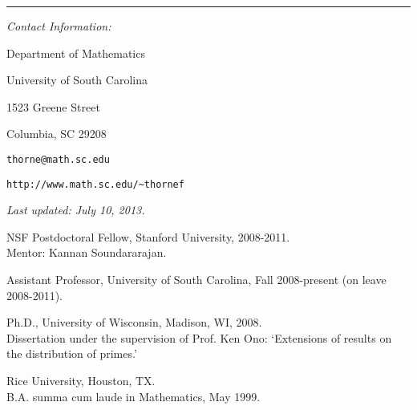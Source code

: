 \documentclass{article}
\newcommand{\name}[1]{
  \begin{center}
    \raisebox{-1.4ex}{\LARGE #1}
  \end{center}
}
\newcommand{\categorywidth}{1in}        %
\newcommand{\infowidth}{5.8in}          %
\newcommand{\categorysep}{5pt}
\newcommand{\catlistlabel}[1]%
{\raisebox{0pt}[1ex][0pt]{\makebox[\labelwidth][l]%
    {\parbox[t]{\labelwidth}{\hspace{0pt}\textbf{#1}}}}}
\newenvironment{categories}{\begin{list}{}{
      \setlength{\labelwidth}{\categorywidth}
      \setlength{\leftmargin}{\labelwidth}
      \addtolength{\leftmargin}{\labelsep}
      \setlength{\topsep}{20pt}
      \setlength{\itemsep}{\categorysep}
      \renewcommand{\makelabel}{\catlistlabel}
      }}{\end{list}}
\newcommand{\category}[1]{\item[#1]}
\newcommand{\rawentry}[1]{{\begin{minipage}[t]{\infowidth}{#1}
    \end{minipage}}}
\begin{document}
\begin{flushleft}


\name{FRANK THORNE}
\rule{7.0in}{.05cm}
\vspace{.15ex}


{\em Contact Information:} %

Department of Mathematics %

University of South Carolina %

1523 Greene Street %

Columbia, SC 29208%

\texttt{thorne@math.sc.edu}

\texttt{http://www.math.sc.edu/\~{}thornef}

\vskip 0.1in
{\em Last updated: July 10, 2013.}


\begin{categories}

  \category{Employment}

  \rawentry{NSF Postdoctoral Fellow, Stanford University, 2008-2011. \\
  Mentor: Kannan Soundararajan.}

  \rawentry{Assistant Professor, University of South Carolina, Fall 2008-present
 (on leave 2008-2011).}

  \category{Education}
  
  \rawentry{Ph.D., University of Wisconsin, Madison, WI, 2008. \\
    Dissertation under the supervision
    of Prof. Ken Ono: `Extensions of results on the distribution of primes.'}

  \rawentry{Rice University, Houston, TX. \\
    B.A. summa cum laude in Mathematics, May 1999.}

  \category{Research \\ Interests}


\end{categories}
\end{flushleft}
\end{document}
